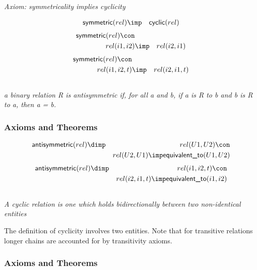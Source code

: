 \emph{Axiom: symmetricality implies cyclicity}

\begin{eqnarray*}
 \pr{symmetric}(rel) &\imp & \pr{cyclic}(rel) 
\end{eqnarray*}
\begin{eqnarray*}
 \pr{symmetric}(rel) \con \\
rel(i1, i2) &\imp &rel(i2, i1) 
\end{eqnarray*}
\begin{eqnarray*}
 \pr{symmetric}(rel) \con \\
rel(i1, i2, t) &\imp &rel(i2, i1, t) 
\end{eqnarray*}

\subsection{ }
\emph{a binary relation R is antisymmetric if, for all a and b, if a is R to b and b is R to a, then a = b.}

\subsubsection{Axioms and Theorems}


\begin{eqnarray*}
 \pr{antisymmetric}(rel) &\dimp &rel(U1, U2) \con \\
&&rel(U2, U1) \imp  \pr{equivalent\_to}(U1, U2) 
\end{eqnarray*}
\begin{eqnarray*}
 \pr{antisymmetric}(rel) &\dimp &rel(i1, i2, t) \con \\
&&rel(i2, i1, t) \imp  \pr{equivalent\_to}(i1, i2) 
\end{eqnarray*}

\subsection{ }
\emph{A cyclic relation is one which holds bidirectionally between two non-identical entities}

The definition of cyclicity involves two entities. Note that for transitive relations longer chains are accounted for by transitivity axioms.

\subsubsection{Axioms and Theorems}


